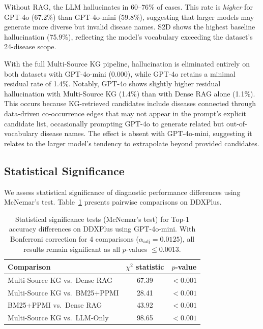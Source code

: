 \documentclass[preprint,12pt]{elsarticle}
\begin{document}
Without RAG, the LLM hallucinates in 60--76\% of cases. This rate is \emph{higher} for GPT-4o (67.2\%) than GPT-4o-mini (59.8\%), suggesting that larger models may generate more diverse but invalid disease names. S2D shows the highest baseline hallucination (75.9\%), reflecting the model's vocabulary exceeding the dataset's 24-disease scope. 

With the full Multi-Source KG pipeline, hallucination is eliminated entirely on both datasets with GPT-4o-mini (0.000), while GPT-4o retains a minimal residual rate of 1.4\%. Notably, GPT-4o shows slightly higher residual hallucination with Multi-Source KG (1.4\%) than with Dense RAG alone (1.1\%). This occurs because KG-retrieved candidates include diseases connected through data-driven co-occurrence edges that may not appear in the prompt's explicit candidate list, occasionally prompting GPT-4o to generate related but out-of-vocabulary disease names. The effect is absent with GPT-4o-mini, suggesting it relates to the larger model's tendency to extrapolate beyond provided candidates.

\subsection{Statistical Significance}

We assess statistical significance of diagnostic performance differences using McNemar's test. Table~\ref{tab:significance} presents pairwise comparisons on DDXPlus.

\begin{table}[t]
\centering
\caption{Statistical significance tests (McNemar's test) for Top-1 accuracy differences on DDXPlus using GPT-4o-mini. With Bonferroni correction for 4 comparisons ($\alpha_{\text{adj}} = 0.0125$), all results remain significant as all $p$-values $\leq 0.0013$.}
\label{tab:significance}
\begin{tabular}{lcc}
\toprule
\textbf{Comparison} & \textbf{$\chi^2$ statistic} & \textbf{$p$-value} \\
\midrule
Multi-Source KG vs.\ Dense RAG        & 67.39 & $< 0.001$ \\
Multi-Source KG vs.\ BM25+PPMI        & 28.41 & $< 0.001$ \\
BM25+PPMI vs.\ Dense RAG               & 43.92 & $< 0.001$ \\
Multi-Source KG vs.\ LLM-Only          & 98.65 & $< 0.001$ \\
\bottomrule
\end{tabular}
\end{table}
\end{document}
